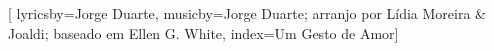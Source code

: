 %

\setcounter{songnum}{136}

[
        lyricsby={Jorge Duarte}, 
        musicby={Jorge Duarte; arranjo por Lídia Moreira \& Joaldi; baseado em Ellen G. White},
        index={Um Gesto de Amor}]

